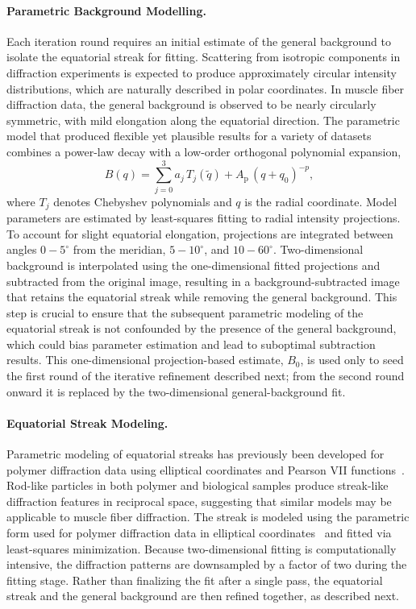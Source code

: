 \documentclass[iucr]{iucrjournals}
\begin{document}
\paragraph{Parametric Background Modelling.}

Each iteration round requires an initial estimate of the general background to isolate the equatorial streak for fitting. Scattering from isotropic components in diffraction experiments is expected to produce approximately circular intensity distributions, which are naturally described in polar coordinates. In muscle fiber diffraction data, the general background is observed to be nearly circularly symmetric, with mild elongation along the equatorial direction. The parametric model that produced flexible yet plausible results for a variety of datasets combines a power-law decay with a low-order orthogonal polynomial expansion,
\begin{equation}
B(q) = \sum_{j=0}^{3} a_j\, T_j(\tilde q) + A_{\mathrm{p}}\, (q + q_0)^{-p},
\end{equation}
where $T_j$ denotes Chebyshev polynomials and $q$ is the radial coordinate. Model parameters are estimated by least-squares fitting to radial intensity projections. To account for slight equatorial elongation, projections are integrated between angles $0-5^{\circ}$ from the meridian, $5-10^{\circ}$, and $10-60^{\circ}$. Two-dimensional background is interpolated using the one-dimensional fitted projections and subtracted from the original image, resulting in a background-subtracted image that retains the equatorial streak while removing the general background. This step is crucial to ensure that the subsequent parametric modeling of the equatorial streak is not confounded by the presence of the general background, which could bias parameter estimation and lead to suboptimal subtraction results. This one-dimensional projection-based estimate, $B_0$, is used only to seed the first round of the iterative refinement described next; from the second round onward it is replaced by the two-dimensional general-background fit.

\paragraph{Equatorial Streak Modeling.}

Parametric modeling of equatorial streaks has previously been developed for polymer diffraction data using elliptical coordinates and Pearson VII functions~\cite{MurthyZeroGrubb1997}. Rod-like particles in both polymer and biological samples produce streak-like diffraction features in reciprocal space, suggesting that similar models may be applicable to muscle fiber diffraction. The streak is modeled using the parametric form used for polymer diffraction data in elliptical coordinates~\cite{MurthyZeroGrubb1997} and fitted via least-squares minimization. Because two-dimensional fitting is computationally intensive, the diffraction patterns are downsampled by a factor of two during the fitting stage. Rather than finalizing the fit after a single pass, the equatorial streak and the general background are then refined together, as described next.
\end{document}
